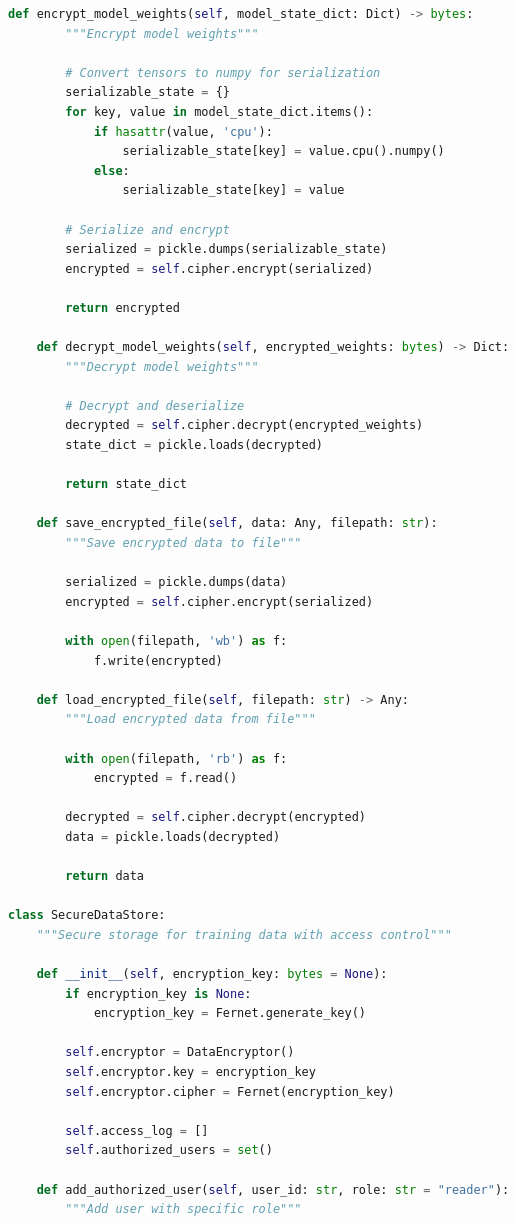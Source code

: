 \begin{lstlisting}[language=Python, caption=Secure Data Handling with Encryption]
    def encrypt_model_weights(self, model_state_dict: Dict) -> bytes:
        """Encrypt model weights"""

        # Convert tensors to numpy for serialization
        serializable_state = {}
        for key, value in model_state_dict.items():
            if hasattr(value, 'cpu'):
                serializable_state[key] = value.cpu().numpy()
            else:
                serializable_state[key] = value

        # Serialize and encrypt
        serialized = pickle.dumps(serializable_state)
        encrypted = self.cipher.encrypt(serialized)

        return encrypted

    def decrypt_model_weights(self, encrypted_weights: bytes) -> Dict:
        """Decrypt model weights"""

        # Decrypt and deserialize
        decrypted = self.cipher.decrypt(encrypted_weights)
        state_dict = pickle.loads(decrypted)

        return state_dict

    def save_encrypted_file(self, data: Any, filepath: str):
        """Save encrypted data to file"""

        serialized = pickle.dumps(data)
        encrypted = self.cipher.encrypt(serialized)

        with open(filepath, 'wb') as f:
            f.write(encrypted)

    def load_encrypted_file(self, filepath: str) -> Any:
        """Load encrypted data from file"""

        with open(filepath, 'rb') as f:
            encrypted = f.read()

        decrypted = self.cipher.decrypt(encrypted)
        data = pickle.loads(decrypted)

        return data

class SecureDataStore:
    """Secure storage for training data with access control"""

    def __init__(self, encryption_key: bytes = None):
        if encryption_key is None:
            encryption_key = Fernet.generate_key()

        self.encryptor = DataEncryptor()
        self.encryptor.key = encryption_key
        self.encryptor.cipher = Fernet(encryption_key)

        self.access_log = []
        self.authorized_users = set()

    def add_authorized_user(self, user_id: str, role: str = "reader"):
        """Add user with specific role"""


\end{lstlisting}
